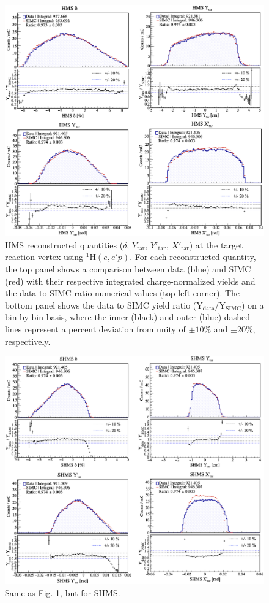 \documentclass[aps, prl]{revtex4-2}  %
\begin{document}
\begin{figure}[h]
\includegraphics[scale=0.36]{plots/hms_acc_3288.png}
\caption{HMS reconstructed quantities ($\delta$,  $Y_{\mathrm{tar}}$, $Y'_{\mathrm{tar}}$, $X'_{\mathrm{tar}}$) at the target reaction vertex using $^{1}$H$(e,e'p)$.
  For each reconstructed quantity, the top panel shows a comparison between data (blue) and SIMC (red) with their respective integrated charge-normalized yields
  and the data-to-SIMC ratio numerical values (top-left corner). The bottom panel shows the data to SIMC yield ratio (Y$_{\mathrm{data}}$/Y$_{\mathrm{SIMC}}$) on a
  bin-by-bin basis, where the inner (black) and outer (blue) dashed lines represent a percent deviation from unity of $\pm10\%$ and $\pm20\%$, respectively.}
\label{fig:fig1}
\end{figure}
\clearpage
\begin{figure}[!ht]
\includegraphics[scale=0.36]{plots/shms_acc_3288.png}
\caption{Same as Fig. \ref{fig:fig1}, but for SHMS. }
\label{fig:fig2}
\end{figure}
\end{document}
